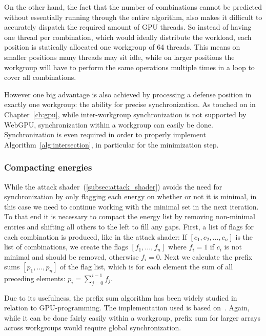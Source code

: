 On the other hand, the fact that the number of combinations cannot be predicted
without essentially running through the entire algorithm,
also makes it difficult to accurately dispatch the required amount of GPU
threads.
So instead of having one thread per combination,
which would ideally distribute the workload,
each position is statically allocated one workgroup of 64 threads.
This means on smaller positions many threads may sit idle,
while on larger positions the workgroup will have to perform the same
operations multiple times in a loop to cover all combinations.

However one big advantage is also achieved by processing a defense position in
exactly one workgroup:
the ability for precise synchronization.
As touched on in Chapter~\ref{ch:gpu}, %
while inter-workgroup synchronization is not supported by \mbox{WebGPU},
synchronization within a workgroup can easily be done.
Synchronization is even required in order to properly implement
Algorithm~\ref{alg:intersection}, in particular for the minimization step.

\subsubsection{Compacting energies}

While the attack shader~(\ref{subsec:attack_shader}) avoids the need for
synchronization by only flagging each energy on whether or not it is minimal,
in this case we need to continue working with the minimal set in the next
iteration.
To that end it is necessary to compact the energy list by removing non-minimal
entries and shifting all others to the left to fill any gaps.
First, a list of flags for each combination is produced, like in the attack
shader:
If $[c_1, c_2, \ldots, c_n]$ is the list of combinations,
we create the flags $[f_1, \ldots, f_n]$ where $f_i = 1$ if $c_i$ is not minimal
and should be removed, otherwise $f_i = 0$.
Next we calculate the prefix sums $[p_1, \ldots, p_n]$ of the flag list,
which is for each element the sum of all preceding elements:
$p_i = \sum_{j = 0}^{i - 1} f_j$.

Due to its usefulness, the prefix sum algorithm has been widely studied in
relation to GPU-programming.
The implementation used is based on~\cite{Harris2011ParallelPS}.
Again, while it can be done fairly easily within a workgroup,
prefix sum for larger arrays across workgroups would require global
synchronization.

